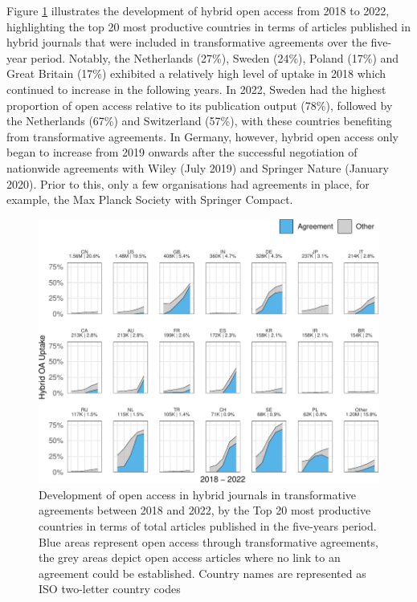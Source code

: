 \documentclass[a4paper,man,floatsintext,longtable,noextraspace,12pt]{apa6}
\begin{document}
Figure \ref{fig:country_top_20_plot} illustrates the development of
hybrid open access from 2018 to 2022, highlighting the top 20 most
productive countries in terms of articles published in hybrid journals
that were included in transformative agreements over the five-year
period. Notably, the Netherlands (27\%), Sweden (24\%), Poland (17\%)
and Great Britain (17\%) exhibited a relatively high level of uptake in
2018 which continued to increase in the following years. In 2022, Sweden
had the highest proportion of open access relative to its publication
output (78\%), followed by the Netherlands (67\%) and Switzerland
(57\%), with these countries benefiting from transformative agreements.
In Germany, however, hybrid open access only began to increase from 2019
onwards after the successful negotiation of nationwide agreements with
Wiley (July 2019) and Springer Nature (January 2020). Prior to this,
only a few organisations had agreements in place, for example, the Max
Planck Society with Springer Compact.

\begin{figure}[ht!]

{\centering \includegraphics[width=0.99\linewidth,]{fig/country_top_20_plot-1} 

}

\caption{Development of open access in hybrid journals in transformative agreements between 2018 and 2022, by the Top 20 most productive countries in terms of total articles published in the five-years period. Blue areas represent open access through transformative agreements, the grey areas depict open access articles where no link to an agreement could be established. Country names are represented as ISO two-letter country codes}\label{fig:country_top_20_plot}
\end{figure}
\end{document}

